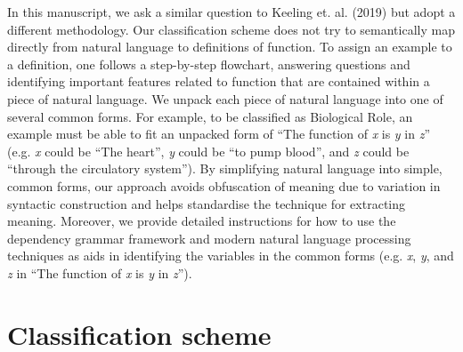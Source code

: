 \documentclass{article}
\begin{document}
In this manuscript, we ask a similar question to Keeling et. al. (2019) but adopt a different methodology.
Our classification scheme does not try to semantically map directly from natural language to definitions of function.
To assign an example to a definition, one follows a step-by-step flowchart, answering questions and identifying important features related to function that are contained within a piece of natural language.
We unpack each piece of natural language into one of several common forms.
For example, to be classified as Biological Role, an example must be able to fit an unpacked form of ``The function of \emph{x} is \emph{y} in \emph{z}'' (e.g. \emph{x} could be ``The heart'', \emph{y} could be ``to pump blood'', and \emph{z} could be ``through the circulatory system'').
By simplifying natural language into simple, common forms, our approach avoids obfuscation of meaning due to variation in syntactic construction and helps standardise the technique for extracting meaning.
Moreover, we provide detailed instructions for how to use the dependency grammar framework and modern natural language processing techniques as aids in identifying the variables in the common forms (e.g. \emph{x}, \emph{y}, and \emph{z} in ``The function of \emph{x} is \emph{y} in \emph{z}'').

\section{Classification scheme}
\label{sec:class-scheme}
\end{document}
